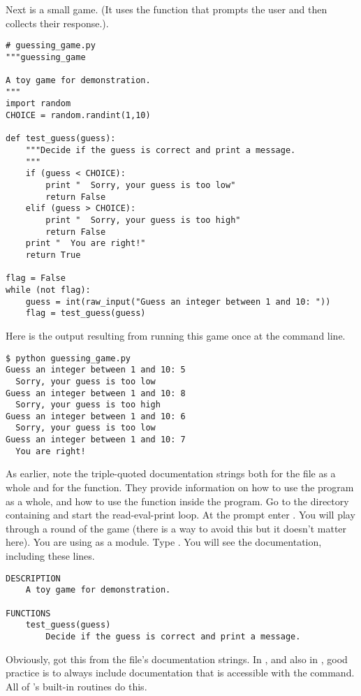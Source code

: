 Next is a small game. 
(It uses the \python{} function  that prompts the user
and then collects their response.).
\begin{lstlisting}[style=python]
# guessing_game.py
"""guessing_game

A toy game for demonstration.
"""
import random
CHOICE = random.randint(1,10)

def test_guess(guess):
    """Decide if the guess is correct and print a message.
    """
    if (guess < CHOICE):
        print "  Sorry, your guess is too low"
        return False
    elif (guess > CHOICE):
        print "  Sorry, your guess is too high"
        return False
    print "  You are right!"
    return True

flag = False
while (not flag):
    guess = int(raw_input("Guess an integer between 1 and 10: "))
    flag = test_guess(guess)
\end{lstlisting}
Here is the output resulting from running this game once at the command line.
\begin{lstlisting}
$ python guessing_game.py
Guess an integer between 1 and 10: 5
  Sorry, your guess is too low
Guess an integer between 1 and 10: 8
  Sorry, your guess is too high
Guess an integer between 1 and 10: 6
  Sorry, your guess is too low
Guess an integer between 1 and 10: 7
  You are right!
\end{lstlisting}  %

As earlier, note the triple-quoted documentation strings both for the 
file as a whole and for the function.
They provide information on how to use the 
program as a whole,
and how to use the function inside the program. 
Go to the directory containing  and start 
the \python{} read-eval-print loop.
At the \inlinecode{>>>} prompt enter .
You will play through a round of the game (there is a way to avoid this
but it doesn't matter here).
You are using  as a module.
Type
.
You will see the documentation, including these lines.
\begin{lstlisting}
DESCRIPTION
    A toy game for demonstration.

FUNCTIONS
    test_guess(guess)
        Decide if the guess is correct and print a message. 
\end{lstlisting}
Obviously, \python{} got this from the file's documentation strings.
In \python{}, and also in \Sage, good practice is 
to always include documentation
that is accessible with the  command.
All of \Sage's built-in routines do this.



